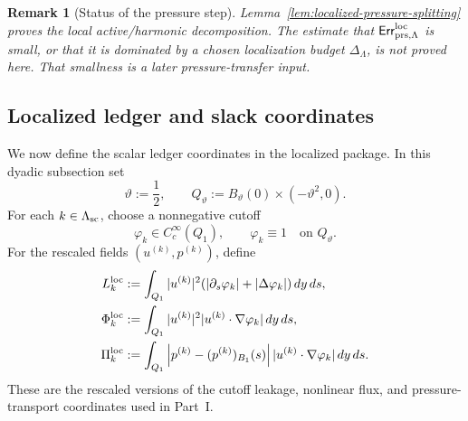 \documentclass[11pt]{article}
\numberwithin{equation}{section}
\newtheorem{remark}[theorem]{Remark}
\newcommand{\Err}{\mathsf{Err}}
\newcommand{\dd}{\,d}
\begin{document}
\begin{remark}[Status of the pressure step]
Lemma~\ref{lem:localized-pressure-splitting} proves the local
active/harmonic decomposition.  The estimate that
\(\Err_{\rm prs,\Lambda}^{\rm loc}\) is small, or that it is dominated by a
chosen localization budget \(\Delta_\Lambda\), is not proved here.  That
smallness is a later pressure-transfer input.
\end{remark}

\subsection{Localized ledger and slack coordinates}\label{subsec:localized-ledger-slack}

We now define the scalar ledger coordinates in the localized package.  In
this dyadic subsection set
\[
        \vartheta:=\frac12,
        \qquad
        Q_\vartheta:=B_\vartheta(0)\times(-\vartheta^2,0).
\]
For each \(k\in\Lambda_{\rm sc}\), choose a nonnegative cutoff
\[
        \varphi_k\in C_c^\infty(Q_1),
        \qquad
        \varphi_k\equiv1\quad\text{on }Q_\vartheta .
\]
For the rescaled fields \((u^{(k)},p^{(k)})\), define
\begin{align}
        L_k^{\rm loc}
        &:=
        \int_{Q_1}
        |u^{(k)}|^2
        (|\partial_s\varphi_k|+|\Delta\varphi_k|)
        \dd y\dd s,\label{eq:loc-leakage}\\
        \Phi_k^{\rm loc}
        &:=
        \int_{Q_1}
        |u^{(k)}|^2
        |u^{(k)}\cdot\nabla\varphi_k|
        \dd y\dd s,\label{eq:loc-flux}\\
        \Pi_k^{\rm loc}
        &:=
        \int_{Q_1}
        \left|
        p^{(k)}-(p^{(k)})_{B_1}(s)
        \right|
        |u^{(k)}\cdot\nabla\varphi_k|
        \dd y\dd s.\label{eq:loc-pressure-transport}
\end{align}
These are the rescaled versions of the cutoff leakage, nonlinear flux, and
pressure-transport coordinates used in Part~I.
\end{document}
